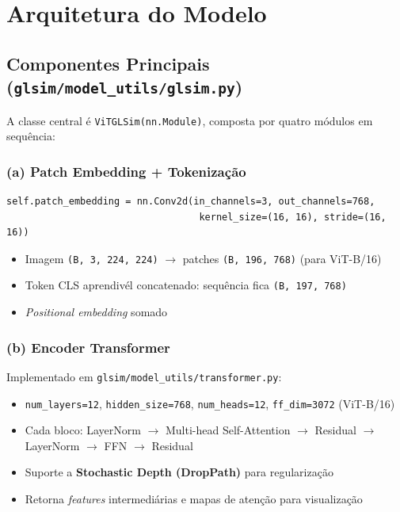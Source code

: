 \documentclass[a4paper,12pt]{scrartcl}
\newenvironment{compactitem}%
  {\begin{itemize}\setlength{\itemsep}{1pt}\setlength{\parsep}{0pt}}%
  {\end{itemize}}
\begin{document}
\section{Arquitetura do Modelo}

\subsection{Componentes Principais
  (\texttt{glsim/model\_utils/glsim.py})}

A classe central \'e \texttt{ViTGLSim(nn.Module)}, composta por quatro
m\'odulos em sequ\^encia:

\subsubsection{(a) Patch Embedding + Tokeniza\c{c}\~ao}

\begin{lstlisting}[style=pythonstyle,
  caption={Defini\c{c}\~ao do patch embedding}]
self.patch_embedding = nn.Conv2d(in_channels=3, out_channels=768,
                                  kernel_size=(16, 16), stride=(16, 16))
\end{lstlisting}

\begin{compactitem}
  \item Imagem \texttt{(B, 3, 224, 224)} $\rightarrow$ patches
        \texttt{(B, 196, 768)} (para ViT-B/16)
  \item Token CLS aprendiv\'el concatenado: sequ\^encia fica
        \texttt{(B, 197, 768)}
  \item \textit{Positional embedding} somado
\end{compactitem}

\subsubsection{(b) Encoder Transformer}

Implementado em \texttt{glsim/model\_utils/transformer.py}:

\begin{compactitem}
  \item \texttt{num\_layers=12}, \texttt{hidden\_size=768},
        \texttt{num\_heads=12}, \texttt{ff\_dim=3072} (ViT-B/16)
  \item Cada bloco: LayerNorm $\to$ Multi-head Self-Attention
        $\to$ Residual $\to$ LayerNorm $\to$ FFN $\to$ Residual
  \item Suporte a \textbf{Stochastic Depth (DropPath)}
        para regulariza\c{c}\~ao
  \item Retorna \textit{features} intermedi\'arias e mapas de aten\c{c}\~ao
        para visualiza\c{c}\~ao
\end{compactitem}
\end{document}
